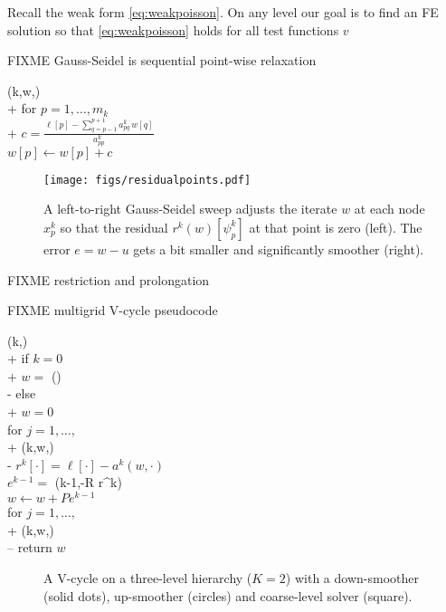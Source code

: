 \documentclass[letterpaper,final,12pt,reqno]{amsart}
\begin{document}
Recall the weak form \eqref{eq:weakpoisson}.  On any level our goal is to find an FE solution so that \eqref{eq:weakpoisson} holds for all test functions $v$

FIXME Gauss-Seidel is sequential point-wise relaxation

\begin{pseudo*}
(k,w,\ell)\text{:} \\+
    for $p=1,\dots,m_k$ \\+
        $\displaystyle c=\frac{\ell[p] - \sum_{q=p-1}^{p+1} a_{pq}^k \,w[q]}{a_{pp}^k}$ \quad {} \\
        $w[p] \gets w[p] + c$
\end{pseudo*}

\begin{figure}
\texttt{[image: figs/residualpoints.pdf]}
\caption{A left-to-right Gauss-Seidel sweep adjusts the iterate $w$ at each node $x_p^k$ so that the residual $r^k(w)[\psi_p^k]$ at that point is zero (left).  The error $e=w-u$ gets a bit smaller and significantly smoother (right).}
\label{fig:residualpoints}
\end{figure}

FIXME restriction and prolongation

FIXME multigrid V-cycle pseudocode

\begin{pseudo*}
(k,\ell)\text{:} \\+
    if $k=0$ \\+
        $w =$ (\ell) \\-  %
    else \\+
        $w=0$ \\
        for $j=1,\dots,$ \\+
            (k,w,\ell) \\-
        $r^k[\cdot] = \ell[\cdot] - a^k(w,\cdot)$ \\
        $e^{k-1} =$ (k-1,-R r^k) \\
        $w \gets w + P e^{k-1}$ \\
        for $j=1,\dots,$ \\+
            (k,w,\ell) \\--
    return $w$
\end{pseudo*}

\begin{figure}

\caption{A V-cycle on a three-level hierarchy ($K=2$) with a down-smoother (solid dots), up-smoother (circles) and coarse-level solver (square).}
\label{fig:vcycle}
\end{figure}
\end{document}
